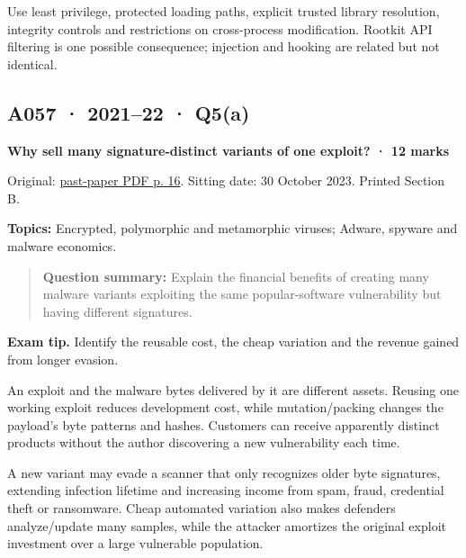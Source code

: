 \documentclass[11pt,a4paper]{article}
\begin{document}
Use least privilege,\allowbreak{} protected loading paths,\allowbreak{} explicit trusted library resolution,\allowbreak{} integrity controls and restrictions on cross-process modification. Rootkit API filtering is one possible consequence; injection and hooking are related but not identical.




\clearpage
\subsection{A057 · 2021–22 · Q5(a)}\label{a057}

\textbf{Why sell many signature-distinct variants of one exploit? · 12 marks}


Original: \href{../../CSE405-Security_Merged.pdf\#page=16}{past-paper PDF p. 16}. Sitting date: 30 October 2023. Printed Section B.


\textbf{Topics:} Encrypted,\allowbreak{} polymorphic and metamorphic viruses; Adware,\allowbreak{} spyware and malware economics.



\begin{quote}\small

\textbf{Question summary:} Explain the financial benefits of creating many malware variants exploiting the same popular-software vulnerability but having different signatures.



\end{quote}


{\color{ForestGreen}\textbf{Exam tip.} Identify the reusable cost,\allowbreak{} the cheap variation and the revenue gained from longer evasion.}


An exploit and the malware bytes delivered by it are different assets. Reusing one working exploit reduces development cost,\allowbreak{} while mutation/\allowbreak{}packing changes the payload's byte patterns and hashes. Customers can receive apparently distinct products without the author discovering a new vulnerability each time.


A new variant may evade a scanner that only recognizes older byte signatures,\allowbreak{} extending infection lifetime and increasing income from spam,\allowbreak{} fraud,\allowbreak{} credential theft or ransomware. Cheap automated variation also makes defenders analyze/\allowbreak{}update many samples,\allowbreak{} while the attacker amortizes the original exploit investment over a large vulnerable population.
\end{document}
